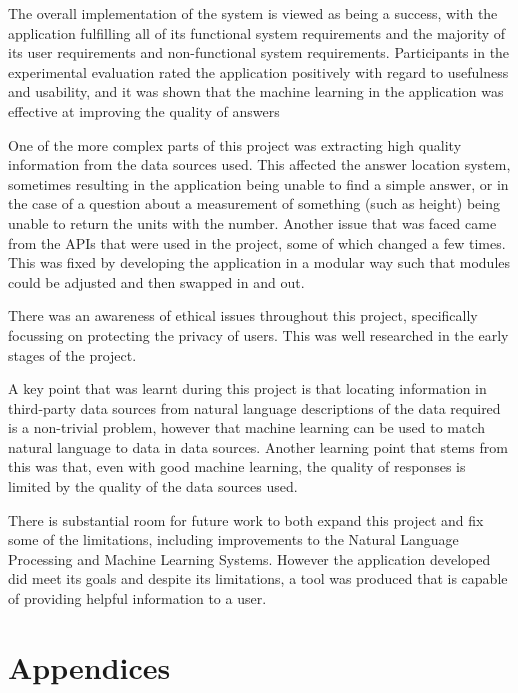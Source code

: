 \documentclass[authoryearcitations]{UoYCSproject}
\begin{document}
The overall implementation of the system is viewed as being a success, with the application fulfilling all of its functional system requirements and the majority of its user requirements and non-functional system requirements. Participants in the experimental evaluation rated the application positively with regard to usefulness and usability, and it was shown that the machine learning in the application was effective at improving the quality of answers

One of the more complex parts of this project was extracting high quality information from the data sources used. This affected the answer location system, sometimes resulting in the application being unable to find a simple answer, or in the case of a question about a measurement of something (such as height) being unable to return the units with the number. Another issue that was faced came from the APIs that were used in the project, some of which changed a few times. This was fixed by developing the application in a modular way such that modules could be adjusted and then swapped in and out.

There was an awareness of ethical issues throughout this project, specifically focussing  on protecting the privacy of users. This was well researched in the early stages of the project.

A key point that was learnt during this project is that locating information in third-party data sources from natural language descriptions of the data required is a non-trivial problem, however that machine learning can be used to match natural language to data in data sources. Another learning point that stems from this was that, even with good machine learning, the quality of responses is limited by the quality of the data sources used.

There is substantial room for future work to both expand this project and fix some of the limitations, including improvements to the Natural Language Processing and Machine Learning Systems. However the application developed did meet its goals and despite its limitations, a tool was produced that is capable of providing helpful information to a user.

\newpage




\appendix
\part{Appendices}
\end{document}
